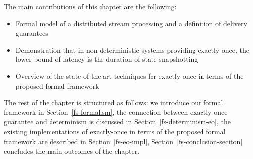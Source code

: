 The main contributions of this chapter are the following: 
\begin{itemize}
    \item Formal model of a distributed stream processing  and a definition of  delivery guarantees 
    \item Demonstration that in non-deterministic systems providing exactly-once, the lower bound of latency is the duration of state snapshotting
    \item Overview of the state-of-the-art techniques for exactly-once in terms of the proposed formal framework
\end{itemize}

The rest of the chapter is structured as follows:
we introduce our formal framework in Section~\ref{fs-formalism},
the connection between exactly-once guarantee and determinism is discussed in Section~\ref{fs-determinism-eo}, 
the existing implementations of exactly-once in terms of the proposed formal framework are described in Section~\ref{fs-eo-impl}, Section~\ref{fs-conclusion-seciton} concludes the main outcomes of the chapter.
